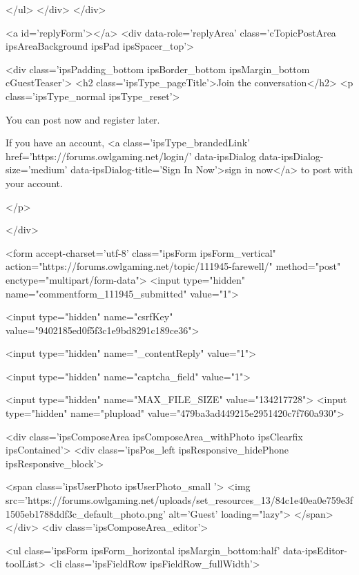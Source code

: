 		
	</ul>
</div>
		</div>
	

	
		<a id='replyForm'></a>
		<div data-role='replyArea' class='cTopicPostArea ipsAreaBackground ipsPad  ipsSpacer_top'>
			
				
				

	
		<div class='ipsPadding_bottom ipsBorder_bottom ipsMargin_bottom cGuestTeaser'>
			<h2 class='ipsType_pageTitle'>Join the conversation</h2>
			<p class='ipsType_normal ipsType_reset'>
	
				
					You can post now and register later.
				
				If you have an account, <a class='ipsType_brandedLink' href='https://forums.owlgaming.net/login/' data-ipsDialog data-ipsDialog-size='medium' data-ipsDialog-title='Sign In Now'>sign in now</a> to post with your account.
				
			</p>
	
		</div>
	


<form accept-charset='utf-8' class="ipsForm ipsForm_vertical" action="https://forums.owlgaming.net/topic/111945-farewell/" method="post" enctype="multipart/form-data">
	<input type="hidden" name="commentform_111945_submitted" value="1">
	
		<input type="hidden" name="csrfKey" value="9402185ed0f5f3c1e9bd8291c189ce36">
	
		<input type="hidden" name="_contentReply" value="1">
	
		<input type="hidden" name="captcha_field" value="1">
	
	
		<input type="hidden" name="MAX_FILE_SIZE" value="134217728">
		<input type="hidden" name="plupload" value="479ba3ad449215e2951420c7f760a930">
	
	<div class='ipsComposeArea ipsComposeArea_withPhoto ipsClearfix ipsContained'>
		<div class='ipsPos_left ipsResponsive_hidePhone ipsResponsive_block'>

	<span class='ipsUserPhoto ipsUserPhoto_small '>
		<img src='https://forums.owlgaming.net/uploads/set_resources_13/84c1e40ea0e759e3f1505eb1788ddf3c_default_photo.png' alt='Guest' loading="lazy">
	</span>
</div>
		<div class='ipsComposeArea_editor'>
			
				
					
				
					
						<ul class='ipsForm ipsForm_horizontal ipsMargin_bottom:half' data-ipsEditor-toolList>
							<li class='ipsFieldRow ipsFieldRow_fullWidth'>
								



